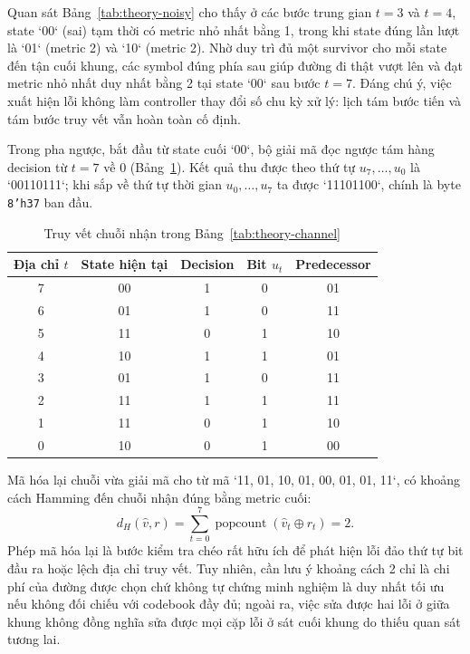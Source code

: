 \documentclass[12pt,a4paper]{article}
\DeclareRobustCommand{\code}[1]{\texttt{#1}}
\renewcommand{\_}{\originalunderscore\allowbreak}
\begin{document}
Quan sát Bảng~\ref{tab:theory-noisy} cho thấy ở các bước trung gian $t=3$ và $t=4$, state `00` (sai) tạm thời có metric nhỏ nhất bằng 1, trong khi state đúng lần lượt là `01` (metric 2) và `10` (metric 2). Nhờ duy trì đủ một survivor cho mỗi state đến tận cuối khung, các symbol đúng phía sau giúp đường đi thật vượt lên và đạt metric nhỏ nhất duy nhất bằng 2 tại state `00` sau bước $t=7$. Đáng chú ý, việc xuất hiện lỗi không làm controller thay đổi số chu kỳ xử lý: lịch tám bước tiến và tám bước truy vết vẫn hoàn toàn cố định.

Trong pha ngược, bắt đầu từ state cuối `00`, bộ giải mã đọc ngược tám hàng decision từ $t=7$ về $0$ (Bảng~\ref{tab:theory-tb}). Kết quả thu được theo thứ tự $u_7,\ldots,u_0$ là `00110111`; khi sắp về thứ tự thời gian $u_0,\ldots,u_7$ ta được `11101100`, chính là byte \code{8'h37} ban đầu.

\begin{table}[H]\centering\small
\begin{tabular}{ccccc}\toprule
\textbf{Địa chỉ $t$}&\textbf{State hiện tại}&\textbf{Decision}&\textbf{Bit $u_t$}&\textbf{Predecessor}\\\midrule
7&00&1&0&01\\
6&01&1&0&11\\
5&11&0&1&10\\
4&10&1&1&01\\
3&01&1&0&11\\
2&11&1&1&11\\
1&11&0&1&10\\
0&10&0&1&00\\
\bottomrule\end{tabular}
\caption{Truy vết chuỗi nhận trong Bảng~\ref{tab:theory-channel}}\label{tab:theory-tb}
\end{table}

Mã hóa lại chuỗi vừa giải mã cho từ mã `11, 01, 10, 01, 00, 01, 01, 11`, có khoảng cách Hamming đến chuỗi nhận đúng bằng metric cuối:
\begin{equation}
d_H(\hat v,r)=\sum_{t=0}^{7}\operatorname{popcount}(\hat v_t\oplus r_t)=2.
\end{equation}
Phép mã hóa lại là bước kiểm tra chéo rất hữu ích để phát hiện lỗi đảo thứ tự bit đầu ra hoặc lệch địa chỉ truy vết. Tuy nhiên, cần lưu ý khoảng cách 2 chỉ là chi phí của đường được chọn chứ không tự chứng minh nghiệm là duy nhất tối ưu nếu không đối chiếu với codebook đầy đủ; ngoài ra, việc sửa được hai lỗi ở giữa khung không đồng nghĩa sửa được mọi cặp lỗi ở sát cuối khung do thiếu quan sát tương lai.
\end{document}

